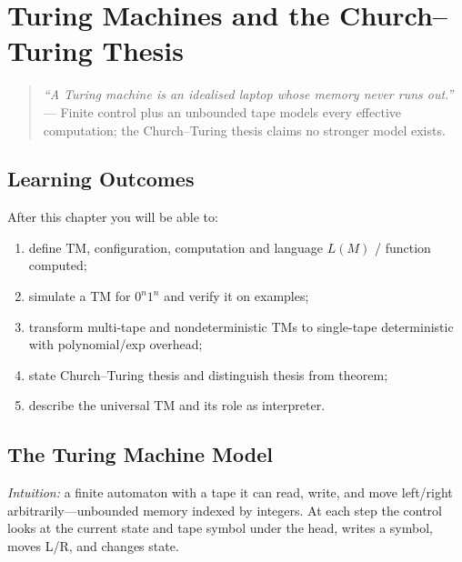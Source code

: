 \chapter{Turing Machines and the Church--Turing Thesis}
\label{ch:turing}

\begin{quote}
\emph{``A Turing machine is an idealised laptop whose memory never runs out.''} --- Finite control plus an unbounded tape models every effective computation; the Church--Turing thesis claims no stronger model exists.
\end{quote}

\noindent{}
\vspace{0.4em}

\section*{Learning Outcomes}
After this chapter you will be able to:
\begin{enumerate}[label=(L\arabic*)]
    \item define TM, configuration, computation and language $L(M)$ / function computed;
    \item simulate a TM for $0^n1^n$ and verify it on examples;
    \item transform multi-tape and nondeterministic TMs to single-tape deterministic with polynomial/exp overhead;
    \item state Church--Turing thesis and distinguish thesis from theorem;
    \item describe the universal TM and its role as interpreter.
\end{enumerate}

\section{The Turing Machine Model}
\label{sec:tm-def}
\emph{Intuition:} a finite automaton with a tape it can read, write, and move left/right arbitrarily---unbounded memory indexed by integers. At each step the control looks at the current state and tape symbol under the head, writes a symbol, moves L/R, and changes state.

